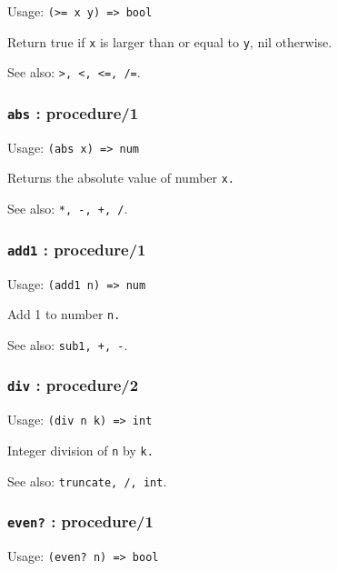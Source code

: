 \documentclass[
]{article}
\newcommand{\passthrough}[1]{#1}
\begin{document}
Usage: \passthrough{\lstinline!(>= x y) => bool!}

Return true if \passthrough{\lstinline!x!} is larger than or equal to
\passthrough{\lstinline!y!}, nil otherwise.

See also: \passthrough{\lstinline!>, <, <=, /=!}.

\hypertarget{abs-procedure1}{%
\subsubsection{\texorpdfstring{\texttt{abs} :
procedure/1}{abs : procedure/1}}\label{abs-procedure1}}

Usage: \passthrough{\lstinline!(abs x) => num!}

Returns the absolute value of number \passthrough{\lstinline!x.!}

See also: \passthrough{\lstinline!*, -, +, /!}.

\hypertarget{add1-procedure1}{%
\subsubsection{\texorpdfstring{\texttt{add1} :
procedure/1}{add1 : procedure/1}}\label{add1-procedure1}}

Usage: \passthrough{\lstinline!(add1 n) => num!}

Add 1 to number \passthrough{\lstinline!n.!}

See also: \passthrough{\lstinline!sub1, +, -!}.

\hypertarget{div-procedure2}{%
\subsubsection{\texorpdfstring{\texttt{div} :
procedure/2}{div : procedure/2}}\label{div-procedure2}}

Usage: \passthrough{\lstinline!(div n k) => int!}

Integer division of \passthrough{\lstinline!n!} by
\passthrough{\lstinline!k.!}

See also: \passthrough{\lstinline!truncate, /, int!}.

\hypertarget{even-procedure1}{%
\subsubsection{\texorpdfstring{\texttt{even?} :
procedure/1}{even? : procedure/1}}\label{even-procedure1}}

Usage: \passthrough{\lstinline!(even? n) => bool!}
\end{document}
